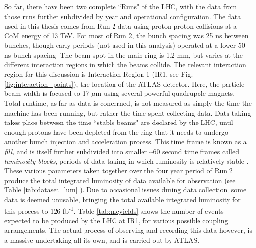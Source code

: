     So far, there have been two complete ``Runs" of the LHC, with the data from those runs further subdivided by year and operational configuration.
    The data used in this thesis comes from Run 2 data using proton-proton collisions at a CoM energy of 13 TeV.
    For most of Run 2, the bunch spacing was 25 ns between bunches, though early periods (not used in this analysis) operated at a lower 50 ns bunch spacing.
    The beam spot in the main ring is 1.2 mm, but varies at the different interaction regions in which the beams collide.
    The relevant interaction region for this discussion is Interaction Region 1 (IR1, see Fig. \ref{fig:interaction_points}), the location of the ATLAS detector.
    Here, the particle beam width is focused to 17 $\mu$m\cite{lhc_run2} using several powerful quadrupole magnets.
    Total runtime, as far as data is concerned, is not measured as simply the time the machine has been running, but rather the time spent collecting data.
    Data-taking takes place between the time ``stable beams" are declared by the LHC, until enough protons have been depleted from the ring that it needs to undergo another bunch injection and acceleration process.
    This time frame is known as a \textit{fill},
        and is itself further subdivided into smaller \textasciitilde 60 second time frames called \textit{luminosity blocks},
        periods of data taking in which luminosity is relatively stable \cite{data_quality}.
    These various parameters taken together over the four year period of Run 2 produce the total integrated luminosity of data available for observation (see Table \ref{tab:dataset_lum} ).
    Due to occasional issues during data collection, some data is deemed unusable,
        bringing the total available integrated luminosity for this process to 126 fb\textsuperscript{-1}.
    Table \ref{tab:mcyields} shows the number of \vbfhhproc events expected to be produced by the LHC at IR1,
        for various possible coupling arrangements.
    The actual process of observing and recording this data however, is a massive undertaking all its own, and is carried out by ATLAS.
